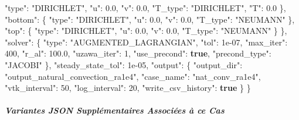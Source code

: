 \documentclass[
  10pt,
]{article}
\newenvironment{Shaded}{}{}
\newcommand{\DataTypeTok}[1]{\textcolor[rgb]{0.56,0.13,0.00}{#1}}
\newcommand{\DecValTok}[1]{\textcolor[rgb]{0.25,0.63,0.44}{#1}}
\newcommand{\FloatTok}[1]{\textcolor[rgb]{0.25,0.63,0.44}{#1}}
\newcommand{\FunctionTok}[1]{\textcolor[rgb]{0.02,0.16,0.49}{#1}}
\newcommand{\KeywordTok}[1]{\textcolor[rgb]{0.00,0.44,0.13}{\textbf{#1}}}
\newcommand{\StringTok}[1]{\textcolor[rgb]{0.25,0.44,0.63}{#1}}
\begin{document}
\begin{Shaded}
\begin{Highlighting}[]
      \DataTypeTok{"type"}\FunctionTok{:} \StringTok{"DIRICHLET"}\FunctionTok{,}
      \DataTypeTok{"u"}\FunctionTok{:} \FloatTok{0.0}\FunctionTok{,}
      \DataTypeTok{"v"}\FunctionTok{:} \FloatTok{0.0}\FunctionTok{,}
      \DataTypeTok{"T\_type"}\FunctionTok{:} \StringTok{"DIRICHLET"}\FunctionTok{,}
      \DataTypeTok{"T"}\FunctionTok{:} \FloatTok{0.0}
    \FunctionTok{\},}
    \DataTypeTok{"bottom"}\FunctionTok{:} \FunctionTok{\{}
      \DataTypeTok{"type"}\FunctionTok{:} \StringTok{"DIRICHLET"}\FunctionTok{,}
      \DataTypeTok{"u"}\FunctionTok{:} \FloatTok{0.0}\FunctionTok{,}
      \DataTypeTok{"v"}\FunctionTok{:} \FloatTok{0.0}\FunctionTok{,}
      \DataTypeTok{"T\_type"}\FunctionTok{:} \StringTok{"NEUMANN"}
    \FunctionTok{\},}
    \DataTypeTok{"top"}\FunctionTok{:} \FunctionTok{\{}
      \DataTypeTok{"type"}\FunctionTok{:} \StringTok{"DIRICHLET"}\FunctionTok{,}
      \DataTypeTok{"u"}\FunctionTok{:} \FloatTok{0.0}\FunctionTok{,}
      \DataTypeTok{"v"}\FunctionTok{:} \FloatTok{0.0}\FunctionTok{,}
      \DataTypeTok{"T\_type"}\FunctionTok{:} \StringTok{"NEUMANN"}
    \FunctionTok{\}}
  \FunctionTok{\},}
  \DataTypeTok{"solver"}\FunctionTok{:} \FunctionTok{\{}
    \DataTypeTok{"type"}\FunctionTok{:} \StringTok{"AUGMENTED\_LAGRANGIAN"}\FunctionTok{,}
    \DataTypeTok{"tol"}\FunctionTok{:} \DecValTok{1e{-}07}\FunctionTok{,}
    \DataTypeTok{"max\_iter"}\FunctionTok{:} \DecValTok{400}\FunctionTok{,}
    \DataTypeTok{"r\_al"}\FunctionTok{:} \FloatTok{100.0}\FunctionTok{,}
    \DataTypeTok{"uzawa\_iter"}\FunctionTok{:} \DecValTok{1}\FunctionTok{,}
    \DataTypeTok{"use\_precond"}\FunctionTok{:} \KeywordTok{true}\FunctionTok{,}
    \DataTypeTok{"precond\_type"}\FunctionTok{:} \StringTok{"JACOBI"}
  \FunctionTok{\},}
  \DataTypeTok{"steady\_state\_tol"}\FunctionTok{:} \DecValTok{1e{-}05}\FunctionTok{,}
  \DataTypeTok{"output"}\FunctionTok{:} \FunctionTok{\{}
    \DataTypeTok{"output\_dir"}\FunctionTok{:} \StringTok{"output\_natural\_convection\_ra1e4"}\FunctionTok{,}
    \DataTypeTok{"case\_name"}\FunctionTok{:} \StringTok{"nat\_conv\_ra1e4"}\FunctionTok{,}
    \DataTypeTok{"vtk\_interval"}\FunctionTok{:} \DecValTok{50}\FunctionTok{,}
    \DataTypeTok{"log\_interval"}\FunctionTok{:} \DecValTok{20}\FunctionTok{,}
    \DataTypeTok{"write\_csv\_history"}\FunctionTok{:} \KeywordTok{true}
  \FunctionTok{\}}
\FunctionTok{\}}
\end{Highlighting}
\end{Shaded}

\subparagraph{Variantes JSON Supplémentaires Associées à ce
Cas}\label{variantes-json-suppluxe9mentaires-associuxe9es-uxe0-ce-cas-2}
\end{document}
